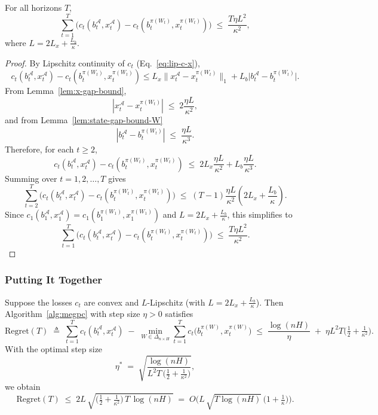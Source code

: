 \begin{Thm:Lemma}
\label{lem:stab-sum-W}
For all horizons \(T\),
\[
\sum_{t=1}^T \Big(
c_t\!\left(b_t^\mathcal{A},x_t^\mathcal{A}\right)
-
c_t\!\left(b_t^{\pi(W_t)},x_t^{\pi(W_t)}\right)
\Big)
\;\le\;
\frac{T \eta L^2}{\kappa^2},
\]
where \(L = 2 L_x + \tfrac{L_b}{\kappa}\).
\end{Thm:Lemma}
\begin{proof}
By Lipschitz continuity of \(c_t\) (Eq.~\eqref{eq:lip-c-x}),
\[
c_t\!\left(b_t^\mathcal{A},x_t^\mathcal{A}\right)
-
c_t\!\left(b_t^{\pi(W_t)},x_t^{\pi(W_t)}\right) 
\le
L_x \big\|x_t^\mathcal{A} - x_t^{\pi(W_t)}\big\|_1
+ L_b \big|b_t^\mathcal{A} - b_t^{\pi(W_t)}\big|.
\]
From Lemma~\ref{lem:x-gap-bound},
\[
|x_t^\mathcal{A} - x_t^{\pi(W_t)}|
\;\le\; 2\frac{\eta L}{\kappa^2},
\]
and from Lemma~\ref{lem:state-gap-bound-W}
\[
|b_t^\mathcal{A} - b_t^{\pi(W_t)}|
\;\le\; \frac{\eta L}{\kappa^3}.
\]
Therefore, for each \(t \ge 2\),
\[
c_t\!\left(b_t^\mathcal{A},x_t^\mathcal{A}\right)
-
c_t\!\left(b_t^{\pi(W_t)},x_t^{\pi(W_t)}\right)
\;\le\;
2L_x \frac{\eta L}{\kappa^2}
+ L_b \frac{\eta L}{\kappa^3}.
\]
Summing over \(t=1,2,\dots,T\) gives
\[
\sum_{t=2}^T
\Big(
c_t(b_t^\mathcal{A},x_t^\mathcal{A})
-
c_t(b_t^{\pi(W_t)},x_t^{\pi(W_t)})
\Big)
\;\le\;
(T-1)\frac{\eta L}{\kappa^2}\left(
2 L_x 
+  \frac{L_b}{\kappa}
\right).
\]
Since 
\(c_1(b_1^\mathcal{A},x_1^\mathcal{A})
=
c_1(b_1^{\pi(W_1)},x_1^{\pi(W_1)})\) and \(L = 2 L_x + \tfrac{L_b}{\kappa}\), this simplifies to
\[
\sum_{t=1}^T
\Big(
c_t(b_t^\mathcal{A},x_t^\mathcal{A})
-
c_t(b_t^{\pi(W_t)},x_t^{\pi(W_t)})
\Big)
\;\le\;
\frac{T \eta L^2}{\kappa^2}.
\]
\end{proof}


\subsubsection{Putting It Together}

\begin{Thm:Theorem}
\label{thm:regret-W}
Suppose the losses \(c_t\) are convex and \(L\)-Lipschitz (with \(L = 2 L_x + \tfrac{L_b}{\kappa}\)).  
Then Algorithm~\ref{alg:megpc} with step size \(\eta>0\) satisfies
\[
\mathrm{Regret}(T)
\;\triangleq\;
\sum_{t=1}^T c_t(b_t^\mathcal{A},x_t^\mathcal{A})
\;-\;
\min_{W\in\Delta_{n\times H}}\sum_{t=1}^T c_t\!\big(b_t^{\pi(W)},x_t^{\pi(W)}\big)
\;\le\;
\frac{\log (nH)}{\eta} \;+\; \eta L^2 T\Big(\tfrac{1}{2} + \tfrac{1}{\kappa^2}\Big).
\]
With the optimal step size
\[
\eta^* \;=\; \sqrt{\frac{\log (nH)}{L^2 T \,\big(\tfrac{1}{2}+\tfrac{1}{\kappa^2}\big)}},
\]
we obtain
\[
\mathrm{Regret}(T)
\;\le\;
2L\,\sqrt{\Big(\tfrac{1}{2}+\tfrac{1}{\kappa^2}\Big)\,T\,\log (nH)}
\;=\; O\!\Big(L\,\sqrt{T\log (nH)}\,\big(1+\tfrac{1}{\kappa}\big)\Big).
\]
\end{Thm:Theorem}

